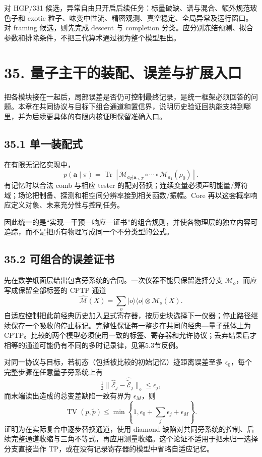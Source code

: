 \documentclass[
  11pt,
  oneside]{book}
\begin{document}
对 HGP/331
候选，异常自由只开启后续任务：标量破缺、谱与混合、额外规范玻色子和
exotic 粒子、味变中性流、精密观测、真空稳定、全局异常及运行窗口。对
framing 候选，则先完成 descent 与 completion
分类。应分别冻结预测、拟合参数和排除条件，不把三代算术通过视为整个模型胜出。

\chapter{35. 量子主干的装配、误差与扩展入口}\label{ch-35}\hypertarget{ch-35}{}

把各模块接在一起后，局部误差是否仍可控制最终记录，是统一框架必须回答的问题。本章在共同协议与目标下组合通道和置信界，说明历史验证回执能支持到哪里，并为后续更具体的有限内核证明保留准确入口。

\section{35.1 单一装配式}

在有限无记忆实现中， \[
p(\mathbf a\mid\pi)=
\operatorname{Tr}\!\left[
\mathcal M_{a_T|\mathbf a_{<T}}\circ\cdots\circ
\mathcal M_{a_1}(\rho_0)\right].
\] 有记忆时以合法 comb 与相应 tester
的配对替换；连续变量必须声明能量/算符域；场论把制备、探测和相空间分辨率接到相关函数/振幅。Core
再以这套概率响应定义对象、未来充分性与控制任务。

因此统一的是``实现---干预---响应---证书''的组合规则，并使各物理层的独立内容可追踪，而不是把所有物理写成同一个不分类型的公式。

\section{35.2 可组合的误差证书}

先在数学纸面层给出包含旁系统的合同。一次仪器不能只保留选择分支
\(\mathcal M_o\)，而应写成保留全部标签的 CPTP 通道 \[
\widehat{\mathcal M}(X)=\sum_o|o\rangle\langle o|\otimes\mathcal M_o(X).
\]
自适应控制把此前经典历史加入显式寄存器，按历史块选择下一仪器；停止路径继续保存一个吸收的停止标记。完整性保证每一整步在共同的经典---量子载体上为
CPTP。比较的两个模型必须使用一致的标签、寄存器和允许协议；丢弃结果后才相等的通道可能仍有不同的多时记录律，见第5.3节反例。

对同一协议与目标，若初态（包括被比较的初始记忆）迹距离误差至多
\(\epsilon_0\)，每个完整步骤在任意量子旁系统上有 \[
\tfrac12\|\widehat{\mathcal E}_j-\widehat{\widetilde{\mathcal E}}_j\|_\diamond
\le\epsilon_j,
\] 而末端读出造成的总变差缺陷一致有界为 \(\epsilon_M\)，则 \[
\operatorname{TV}(p,\widetilde p)
\le\min\left\{1,\epsilon_0+\sum_j\epsilon_j+\epsilon_M\right\}.
\] 证明为在实际复合中逐步替换通道，使用 diamond
缺陷对共同旁系统的控制、后续完整通道收缩与三角不等式，再应用测量收缩。这个论证不适用于把未归一选择分支直接当作
TP，或在没有记录寄存器的模型中省略自适应记忆。
\end{document}
